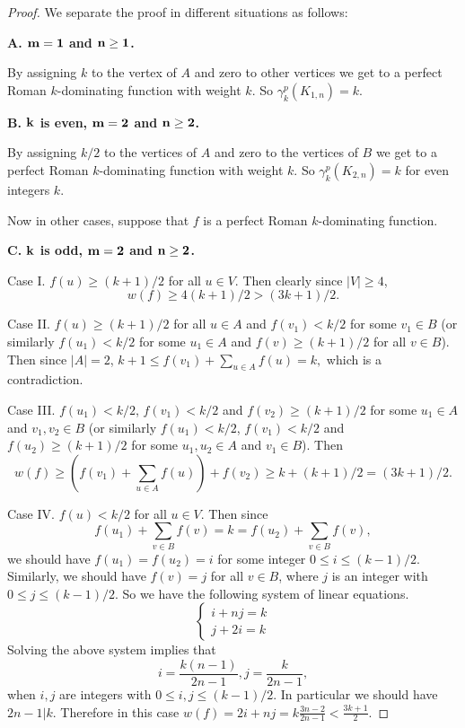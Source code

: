 \documentclass[12pt]{amsart}
\begin{document}
\begin{proof}
We separate the proof in different situations as follows:

\textbf{A.  ${\bf m=1}$ and ${\bf n\geq 1}$.} 

By assigning $k$ to the vertex of $A$ and zero to other vertices we get to a perfect Roman $k$-dominating function with weight $k$. So $\gamma_k^p (K_{1,n})=k$. 

\textbf{B. ${\bf k}$ is even, ${\bf m=2}$ and ${\bf n\geq 2}$.} 

By assigning $k/2$ to the vertices of $A$ and zero to the vertices of $B$ we get to a perfect Roman $k$-dominating function with weight $k$. So $\gamma_k^p (K_{2,n})=k$ for even integers $k$.

Now in other cases, suppose that $f$ is a perfect Roman $k$-dominating function. 

\textbf{C. ${\bf k}$ is odd, ${\bf m=2}$ and ${\bf n\geq 2}$.} 


Case I. $f(u)\geq (k+1)/2$ for all $u\in V$. Then clearly since $|V|\geq 4$,
$$w(f)\geq 4(k+1)/2>(3k+1)/2.$$

Case II. $f(u)\geq (k+1)/2$ for all $u\in A$ and $f(v_1)<k/2$ for some $v_1\in B$ (or similarly $f(u_1)<k/2$ for some $u_1\in A$ and $f(v)\geq (k+1)/2$ for all $v\in B$). Then since $|A|=2$,
$k+1\leq f(v_1)+\sum_{u\in A}f(u)=k,$ which is a contradiction.

Case III. $f(u_1)<k/2$, $f(v_1)< k/2$ and $f(v_2)\geq (k+1)/2$ for some $u_1\in A$ and $v_1,v_2\in B$ (or similarly $f(u_1)<k/2$, $f(v_1)< k/2$ and $f(u_2)\geq (k+1)/2$ for some $u_1, u_2\in A$ and  $v_1\in B$). Then 
$$w(f)\geq (f(v_1)+\sum_{u\in A}f(u))+f(v_2)\geq k+(k+1)/2=(3k+1)/2.$$

Case IV.  $f(u)<k/2$ for all $u\in V$. Then since 
$$f(u_1)+\sum_{v\in B}f(v)=k=f(u_2)+\sum_{v\in B}f(v),$$
we should have $f(u_1)=f(u_2)=i$ for some integer $0\leq i \leq (k-1)/2$. Similarly, we should have $f(v)=j$ for all $v\in B$, where $j$ is an integer with $0\leq j \leq (k-1)/2$. So we have the following system of linear equations.
\begin{equation}\label{1.1}
\left\lbrace \begin{array}{l}
i+nj=k \\ 
j+2i=k
\end{array}\right.
\end{equation}
Solving the above system implies that
$$i=\frac{k(n-1)}{2n-1}, j=\frac{k}{2n-1},$$
when $i,j$ are integers with $0\leq i,j \leq (k-1)/2$. In particular we should have $2n-1 | k$. Therefore
in this case $w(f)=2i+nj=k\frac{3n-2}{2n-1}<\frac{3k+1}{2}$.


\end{proof}
\end{document}
